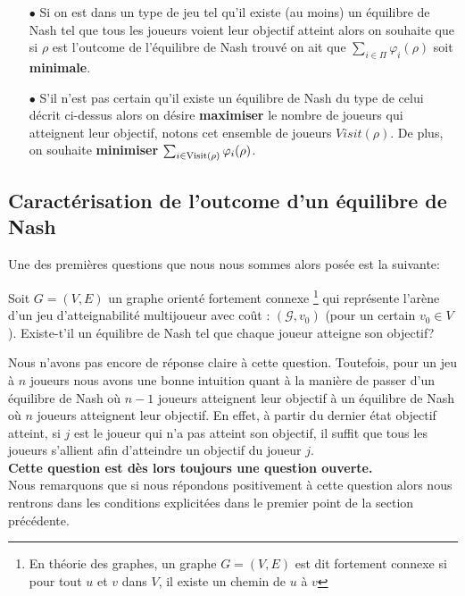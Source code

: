 \begin{itemize}
	\item[$\bullet$] Si on est dans un type de jeu tel qu'il existe (au moins) un équilibre de Nash tel que tous les joueurs voient leur objectif atteint alors on souhaite que si $\rho$ est l'outcome de l'équilibre de Nash trouvé on ait que
	$ \sum_{i \in \Pi} \varphi_i(\rho)$ soit \textbf{minimale}.
	\item[$\bullet$]S'il n'est pas certain qu'il existe un équilibre de Nash du type de celui décrit ci-dessus alors on désire \textbf{maximiser} le nombre de joueurs qui atteignent leur objectif, notons cet ensemble de joueurs $Visit(\rho)$. De plus, on souhaite \textbf{minimiser} $\sum_{i \in \operatorname*{Visit}(\rho)} \varphi_i(\rho)$.
\end{itemize}

\subsection{Caractérisation de l'outcome d'un équilibre de Nash}

Une des premières questions que nous nous sommes alors posée est la suivante:
\begin{qst}
	\label{qst:1}
	
	Soit $G = (V,E)$ un graphe orienté fortement connexe \footnote{En théorie des graphes, un graphe $G = (V,E)$ est dit fortement connexe si pour tout $u$ et $v$ dans $V$, il existe un chemin de $u$ à $v$} qui représente l'arène d'un jeu d'atteignabilité multijoueur avec coût : $(\mathcal{G},v_{0})$ (pour un certain $v_{0} \in V$).
Existe-t'il un équilibre de Nash tel que chaque joueur atteigne son objectif?

\end{qst}

Nous n'avons pas encore de réponse claire à cette question. Toutefois, pour un jeu à $n$ joueurs nous avons une bonne intuition quant à la manière de passer d'un équilibre de Nash où $n-1$ joueurs atteignent leur objectif à un équilibre de Nash où $n$ joueurs atteignent leur objectif. En effet, à partir du dernier état objectif atteint, si $j$ est le joueur qui n'a pas atteint son objectif, il suffit que tous les joueurs s'allient afin d'atteindre un objectif du joueur $j$.\\\textbf{Cette question est dès lors toujours une question ouverte.}
\\

Nous remarquons que si nous répondons positivement à cette question alors nous rentrons dans les conditions explicitées dans le premier point de la section précédente.



